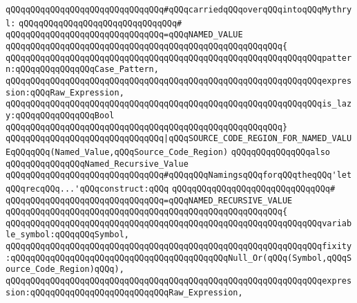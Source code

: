 \verb|qQQqqQQqqQQqqQQqqQQqqQQqqQQqqQQq#qQQqcarriedqQQqoverqQQqintoqQQqMythryl:|\newline
\verb|qQQqqQQqqQQqqQQqqQQqqQQqqQQqqQQq#|\newline
\verb|qQQqqQQqqQQqqQQqqQQqqQQqqQQqqQQq=qQQqNAMED_VALUE|\newline
\verb|qQQqqQQqqQQqqQQqqQQqqQQqqQQqqQQqqQQqqQQqqQQqqQQqqQQqqQQq{|\newline
\verb|qQQqqQQqqQQqqQQqqQQqqQQqqQQqqQQqqQQqqQQqqQQqqQQqqQQqqQQqqQQqqQQqpattern:qQQqqQQqqQQqqQQqCase_Pattern,|\newline
\verb|qQQqqQQqqQQqqQQqqQQqqQQqqQQqqQQqqQQqqQQqqQQqqQQqqQQqqQQqqQQqqQQqexpression:qQQqRaw_Expression,|\newline
\verb|qQQqqQQqqQQqqQQqqQQqqQQqqQQqqQQqqQQqqQQqqQQqqQQqqQQqqQQqqQQqqQQqis_lazy:qQQqqQQqqQQqqQQqBool|\newline
\verb|qQQqqQQqqQQqqQQqqQQqqQQqqQQqqQQqqQQqqQQqqQQqqQQqqQQqqQQq}|\newline
\newline
\verb|qQQqqQQqqQQqqQQqqQQqqQQqqQQqqQQq|\verb#|qQQqSOURCE_CODE_REGION_FOR_NAMED_VALUEqQQqqQQq(Named_Value,qQQqSource_Code_Region)#\newline
\newline
\newline
\newline
\verb|qQQqqQQqqQQqqQQqalso|\newline
\verb|qQQqqQQqqQQqqQQqNamed_Recursive_Value|\newline
\newline
\verb|qQQqqQQqqQQqqQQqqQQqqQQqqQQqqQQq#qQQqqQQqNamingsqQQqforqQQqtheqQQq'letqQQqrecqQQq...'qQQqconstruct:qQQq|\newline
\verb|qQQqqQQqqQQqqQQqqQQqqQQqqQQqqQQq#|\newline
\verb|qQQqqQQqqQQqqQQqqQQqqQQqqQQqqQQq=qQQqNAMED_RECURSIVE_VALUE|\newline
\verb|qQQqqQQqqQQqqQQqqQQqqQQqqQQqqQQqqQQqqQQqqQQqqQQqqQQqqQQq{|\newline
\verb|qQQqqQQqqQQqqQQqqQQqqQQqqQQqqQQqqQQqqQQqqQQqqQQqqQQqqQQqqQQqqQQqvariable_symbol:qQQqqQQqSymbol,|\newline
\verb|qQQqqQQqqQQqqQQqqQQqqQQqqQQqqQQqqQQqqQQqqQQqqQQqqQQqqQQqqQQqqQQqfixity:qQQqqQQqqQQqqQQqqQQqqQQqqQQqqQQqqQQqqQQqqQQqNull_Or(qQQq(Symbol,qQQqSource_Code_Region)qQQq),|\newline
\verb|qQQqqQQqqQQqqQQqqQQqqQQqqQQqqQQqqQQqqQQqqQQqqQQqqQQqqQQqqQQqqQQqexpression:qQQqqQQqqQQqqQQqqQQqqQQqqQQqRaw_Expression,|\newline
